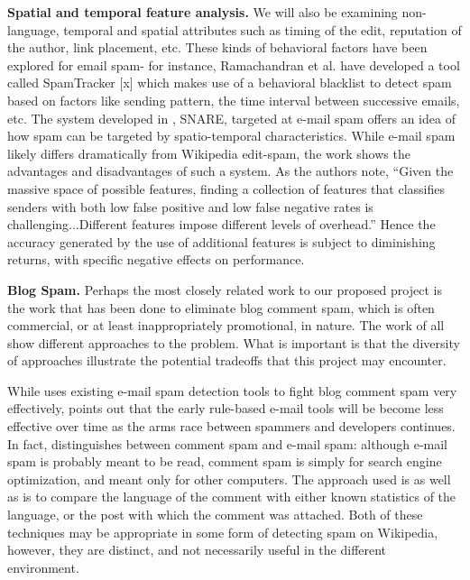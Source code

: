 \documentclass[letterpaper]{sig-alternate}
\begin{document}
\textbf{Spatial and temporal feature analysis.} We will also be examining non-language, temporal and spatial attributes such as timing of the edit, reputation of the author, link placement, etc.  These kinds of behavioral factors have been explored for email spam- for instance, Ramachandran et al. have developed a tool called SpamTracker [x] which makes use of a behavioral blacklist to detect spam based on factors like sending pattern, the time interval between successive emails, etc. The system developed in \cite{snare}, SNARE, targeted at e-mail spam offers an idea of how spam can be targeted by spatio-temporal characteristics. While e-mail spam likely differs dramatically from Wikipedia edit-spam, the work shows the advantages and disadvantages of such a system. As the authors note, ``Given the massive space of possible features, finding a collection of features that classifies senders with both low false positive and low false negative rates is challenging...Different features impose different levels of overhead.'' Hence the accuracy generated by the use of additional features is subject to diminishing returns, with specific negative effects on performance.

\textbf{Blog Spam.} Perhaps the most closely related work to our proposed project is the work that has been done to eliminate blog comment spam, which is often commercial, or at least inappropriately promotional, in nature. The work of \cite{Thomason_blogspam, Narisawa06detectingblog, Mishne05blockingblog, Han06collaborativeblog} all show different approaches to the problem. What is important is that the diversity of approaches illustrate the potential tradeoffs that this project may encounter.

While \cite{Thomason_blogspam} uses existing e-mail spam detection tools to fight blog comment spam very effectively, \cite{Narisawa06detectingblog} points out that the early rule-based e-mail tools will be become less effective over time as the arms race between spammers and developers continues. In fact, \cite{Narisawa06detectingblog} distinguishes between comment spam and e-mail spam: although e-mail spam is probably meant to be read, comment spam is simply for search engine optimization, and meant only for other computers. The approach used is \cite{Narisawa06detectingblog} as well as \cite{Mishne05blockingblog} is to compare the language of the comment with either known statistics of the language, or the post with which the comment was attached. Both of these techniques may be appropriate in some form of detecting spam on Wikipedia, however, they are distinct, and not necessarily useful in the different environment.
\end{document}
